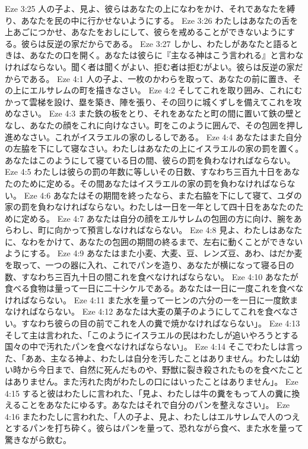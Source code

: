 Eze 3:25  人の子よ、見よ、彼らはあなたの上になわをかけ、それであなたを縛り、あなたを民の中に行かせないようにする。
Eze 3:26  わたしはあなたの舌を上あごにつかせ、あなたをおしにして、彼らを戒めることができないようにする。彼らは反逆の家だからである。
Eze 3:27  しかし、わたしがあなたと語るときは、あなたの口を開く。あなたは彼らに『主なる神はこう言われる』と言わなければならない。聞く者は聞くがよい、拒む者は拒むがよい。彼らは反逆の家だからである。
Eze 4:1  人の子よ、一枚のかわらを取って、あなたの前に置き、その上にエルサレムの町を描きなさい。
Eze 4:2  そしてこれを取り囲み、これにむかって雲梯を設け、塁を築き、陣を張り、その回りに城くずしを備えてこれを攻めなさい。
Eze 4:3  また鉄の板をとり、それをあなたと町の間に置いて鉄の壁となし、あなたの顔をこれに向けなさい。町をこのように囲んで、その包囲を押し進めなさい。これがイスラエルの家のしるしである。
Eze 4:4  あなたはまた自分の左脇を下にして寝なさい。わたしはあなたの上にイスラエルの家の罰を置く。あなたはこのようにして寝ている日の間、彼らの罰を負わなければならない。
Eze 4:5  わたしは彼らの罰の年数に等しいその日数、すなわち三百九十日をあなたのために定める。その間あなたはイスラエルの家の罰を負わなければならない。
Eze 4:6  あなたはその期間を終ったなら、また右脇を下にして寝て、ユダの家の罰を負わなければならない。わたしは一日を一年として四十日をあなたのために定める。
Eze 4:7  あなたは自分の顔をエルサレムの包囲の方に向け、腕をあらわし、町に向かって預言しなければならない。
Eze 4:8  見よ、わたしはあなたに、なわをかけて、あなたの包囲の期間の終るまで、左右に動くことができないようにする。
Eze 4:9  あなたはまた小麦、大麦、豆、レンズ豆、あわ、はだか麦を取って、一つの器に入れ、これでパンを造り、あなたが横になって寝る日の数、すなわち三百九十日の間これを食べなければならない。
Eze 4:10  あなたが食べる食物は量って一日に二十シケルである。あなたは一日に一度これを食べなければならない。
Eze 4:11  また水を量って一ヒンの六分の一を一日に一度飲まなければならない。
Eze 4:12  あなたは大麦の菓子のようにしてこれを食べなさい。すなわち彼らの目の前でこれを人の糞で焼かなければならない」。
Eze 4:13  そして主は言われた、「このようにイスラエルの民はわたしが追いやろうとする国々の中で汚れたパンを食べなければならない」。
Eze 4:14  そこでわたしは言った、「ああ、主なる神よ、わたしは自分を汚したことはありません。わたしは幼い時から今日まで、自然に死んだものや、野獣に裂き殺されたものを食べたことはありません。また汚れた肉がわたしの口にはいったことはありません」。
Eze 4:15  すると彼はわたしに言われた、「見よ、わたしは牛の糞をもって人の糞に換えることをあなたにゆるす。あなたはそれで自分のパンを整えなさい」。
Eze 4:16  またわたしに言われた、「人の子よ、見よ、わたしはエルサレムで人のつえとするパンを打ち砕く。彼らはパンを量って、恐れながら食べ、また水を量って驚きながら飲む。

